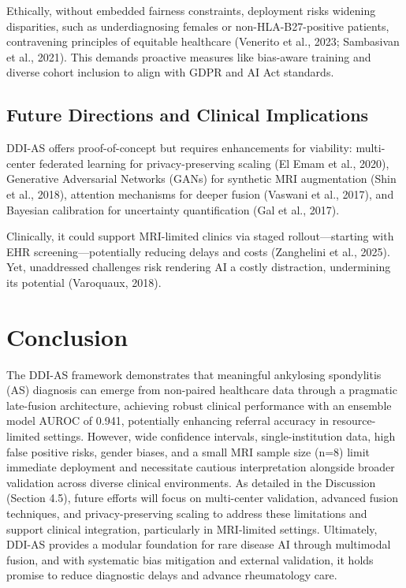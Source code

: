 \documentclass[12pt, a4paper]{article}
\begin{document}
Ethically, without embedded fairness constraints, deployment risks widening disparities, such as underdiagnosing females or non-HLA-B27-positive patients, contravening principles of equitable healthcare (Venerito et al., 2023; Sambasivan et al., 2021). This demands proactive measures like bias-aware training and diverse cohort inclusion to align with GDPR and AI Act standards.

\subsection{Future Directions and Clinical Implications}
DDI-AS offers proof-of-concept but requires enhancements for viability: multi-center federated learning for privacy-preserving scaling (El Emam et al., 2020), Generative Adversarial Networks (GANs) for synthetic MRI augmentation (Shin et al., 2018), attention mechanisms for deeper fusion (Vaswani et al., 2017), and Bayesian calibration for uncertainty quantification (Gal et al., 2017). 

Clinically, it could support MRI-limited clinics via staged rollout—starting with EHR screening—potentially reducing delays and costs (Zanghelini et al., 2025). Yet, unaddressed challenges risk rendering AI a costly distraction, undermining its potential (Varoquaux, 2018).

\section{Conclusion}
The DDI-AS framework demonstrates that meaningful ankylosing spondylitis (AS) diagnosis can emerge from non-paired healthcare data through a pragmatic late-fusion architecture, achieving robust clinical performance with an ensemble model AUROC of 0.941, potentially enhancing referral accuracy in resource-limited settings. However, wide confidence intervals, single-institution data, high false positive risks, gender biases, and a small MRI sample size (n=8) limit immediate deployment and necessitate cautious interpretation alongside broader validation across diverse clinical environments. As detailed in the Discussion (Section 4.5), future efforts will focus on multi-center validation, advanced fusion techniques, and privacy-preserving scaling to address these limitations and support clinical integration, particularly in MRI-limited settings. Ultimately, DDI-AS provides a modular foundation for rare disease AI through multimodal fusion, and with systematic bias mitigation and external validation, it holds promise to reduce diagnostic delays and advance rheumatology care.
\end{document}
